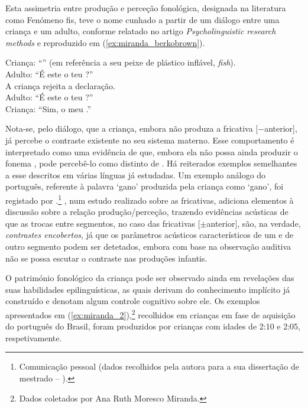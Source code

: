 \documentclass[output=paper]{LSP/langsci}
\begin{document}
Esta assimetria entre produção e perceção fonológica, designada na literatura como Fenómeno fis, teve o nome cunhado a partir de um diálogo entre uma criança e um adulto, conforme relatado no artigo \textit{Psycholinguistic research methods} \citep{berkobrown1960} e reproduzido em (\ref{ex:miranda_berkobrown}).

\ea\label{ex:miranda_berkobrown}
Criança: ``'' (em referência a seu peixe de plástico inflável, \textit{fish}).\\
Adulto: ``É este o teu ?''\\
A criança rejeita a declaração.\\
Adulto: ``É este o teu ?''\\
Criança: ``Sim, o meu .''
\z

Nota-se, pelo diálogo, que a criança, embora não produza a fricativa [$-$anterior], já percebe o contraste existente no seu sistema materno. Esse comportamento é interpretado como uma evidência de que, embora ela não possa ainda produzir o fonema , pode percebê-lo como distinto de . Há reiterados exemplos semelhantes a esse descritos em várias línguas já estudadas. Um exemplo análogo do português, referente à palavra ‘gan\textipa{[S]}o’ produzida pela criança como ‘gan\textipa{[s]}o’, foi registado por \citet{matzenauer1988}.\footnote{Comunicação pessoal (dados recolhidos pela autora para a sua dissertação de mestrado – \citealt{matzenauer1988}).}
\citet{berti2006}, num estudo realizado sobre as fricativas, adiciona elementos à discussão sobre a relação produção/perceção, trazendo evidências acústicas de que as trocas entre segmentos, no caso das fricativas [$\pm$anterior], são, na verdade, \textit{contrastes encobertos}, já que os parâmetros acústicos característicos de um e de outro segmento podem ser detetados, embora com base na observação auditiva não se possa escutar o contraste nas produções infantis.

O património fonológico da criança pode ser observado ainda em revelações das suas habilidades epilinguísticas, as quais derivam do conhecimento implícito já construído e denotam algum controle cognitivo sobre ele. Os exemplos apresentados em (\ref{ex:miranda_2}),\footnote{Dados coletados por Ana Ruth Moresco Miranda.} recolhidos em crianças em fase de aquisição do português do Brasil, foram produzidos por crianças com idades de 2:10 e 2:05, respetivamente.
\end{document}
